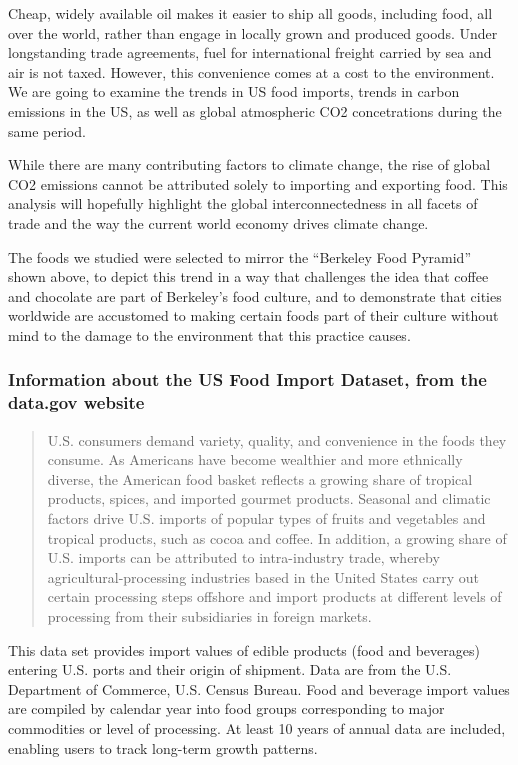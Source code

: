 \documentclass[]{article}
\begin{document}
Cheap, widely available oil makes it easier to ship all goods, including
food, all over the world, rather than engage in locally grown and
produced goods. Under longstanding trade agreements, fuel for
international freight carried by sea and air is not taxed. However, this
convenience comes at a cost to the environment. We are going to examine
the trends in US food imports, trends in carbon emissions in the US, as
well as global atmospheric CO2 concetrations during the same period.

While there are many contributing factors to climate change, the rise of
global CO2 emissions cannot be attributed solely to importing and
exporting food. This analysis will hopefully highlight the global
interconnectedness in all facets of trade and the way the current world
economy drives climate change.

The foods we studied were selected to mirror the ``Berkeley Food
Pyramid'' shown above, to depict this trend in a way that challenges the
idea that coffee and chocolate are part of Berkeley's food culture, and
to demonstrate that cities worldwide are accustomed to making certain
foods part of their culture without mind to the damage to the
environment that this practice causes.

\subsubsection{Information about the US Food Import Dataset, from the
data.gov
website}\label{information-about-the-us-food-import-dataset-from-the-data.gov-website}

\begin{quote}
U.S. consumers demand variety, quality, and convenience in the foods
they consume. As Americans have become wealthier and more ethnically
diverse, the American food basket reflects a growing share of tropical
products, spices, and imported gourmet products. Seasonal and climatic
factors drive U.S. imports of popular types of fruits and vegetables and
tropical products, such as cocoa and coffee. In addition, a growing
share of U.S. imports can be attributed to intra-industry trade, whereby
agricultural-processing industries based in the United States carry out
certain processing steps offshore and import products at different
levels of processing from their subsidiaries in foreign markets.
\end{quote}

This data set provides import values of edible products (food and
beverages) entering U.S. ports and their origin of shipment. Data are
from the U.S. Department of Commerce, U.S. Census Bureau. Food and
beverage import values are compiled by calendar year into food groups
corresponding to major commodities or level of processing. At least 10
years of annual data are included, enabling users to track long-term
growth patterns.
\end{document}
